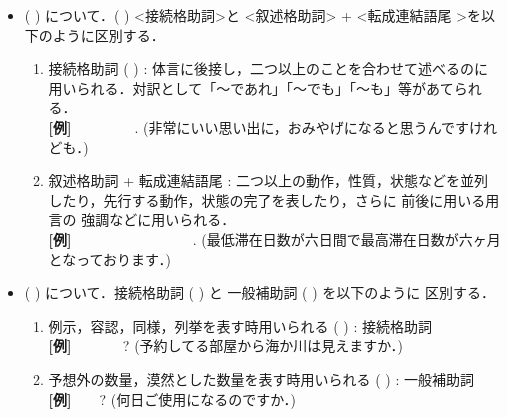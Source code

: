 \begin{itemize}        
\item 
(
)
 について．(
)
<接続格助詞>と 
<叙述格助詞> + 
<転成連結語尾
>を以下のように区別する．

\begin{enumerate}
\item 
接続格助詞 (
)
 : 体言に後接し，二つ以上のことを合わせて述べるのに
用いられる．対訳として「〜であれ」「〜でも」「〜も」等があてられる．\\
{\bf [例]} 
\ 
\ 
\underline{
}\ 
\ 
\ 
.
(非常にいい思い出に，おみやげになると思うんですけれども．)

\item 
叙述格助詞 
 + 転成連結語尾 
 : 二つ以上の動作，性質，状態などを並列
したり，先行する動作，状態の完了を表したり，さらに 前後に用いる用言の
強調などに用いられる．\\ 
{\bf [例]} 
\ 
\ 
\ 
\ 
\underline{
}\ 
\ 
\ 
\ 
\ 
\ 
.
(最低滞在日数が六日間で最高滞在日数が六ヶ月となっております．)

\end{enumerate}


\item 
(
)
 について．接続格助詞 (
)
 と 一般補助詞 (
)
を以下のように
区別する．

\begin{enumerate}
\item 
例示，容認，同様，列挙を表す時用いられる (
)
 : 接続格助詞\\
{\bf [例]} 
\ 
\ 
\underline{
}\ 
\ 
?
(予約してる部屋から海か川は見えますか．)

\item 
予想外の数量，漠然とした数量を表す時用いられる (
)
 : 一般補助詞\\
{\bf [例]} 
\underline{
}\ 
\ 
? (何日ご使用になるのですか．)
\end{enumerate}

\end{itemize}

